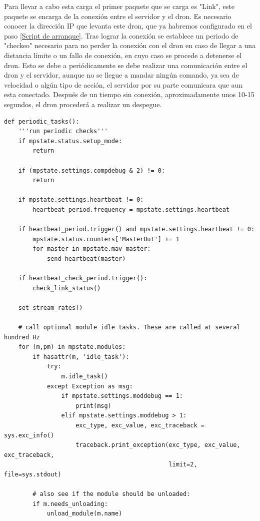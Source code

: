 Para llevar a cabo esta carga el primer paquete que se carga es "Link", este paquete se encarga de la conexión entre el servidor y el dron. Es necesario conocer la dirección IP que levanta este dron, que ya habremos configurado en el paso \ref{Script de arranque}. Tras lograr la conexión se establece un periodo de "checkeo" necesario para no perder la conexión con el dron en caso de llegar a una distancia límite o un fallo de conexión, en cuyo caso se procede a detenerse el dron. Esto se debe a periódicamente se debe realizar una comunicación entre el dron y el servidor, aunque no se llegue a mandar ningún comando, ya sea de velocidad o algún tipo de acción, el servidor por su parte comunicara que aun esta conectado. Después de un tiempo sin conexión, aproximadamente unos 10-15 segundos, el dron procederá a realizar un despegue. 

{\scriptsize
\begin{verbatim}
def periodic_tasks():
    '''run periodic checks'''
    if mpstate.status.setup_mode:
        return

    if (mpstate.settings.compdebug & 2) != 0:
        return

    if mpstate.settings.heartbeat != 0:
        heartbeat_period.frequency = mpstate.settings.heartbeat

    if heartbeat_period.trigger() and mpstate.settings.heartbeat != 0:
        mpstate.status.counters['MasterOut'] += 1
        for master in mpstate.mav_master:
            send_heartbeat(master)

    if heartbeat_check_period.trigger():
        check_link_status()

    set_stream_rates()

    # call optional module idle tasks. These are called at several hundred Hz
    for (m,pm) in mpstate.modules:
        if hasattr(m, 'idle_task'):
            try:
                m.idle_task()
            except Exception as msg:
                if mpstate.settings.moddebug == 1:
                    print(msg)
                elif mpstate.settings.moddebug > 1:
                    exc_type, exc_value, exc_traceback = sys.exc_info()
                    traceback.print_exception(exc_type, exc_value, exc_traceback,
                                              limit=2, file=sys.stdout)

        # also see if the module should be unloaded:
        if m.needs_unloading:
            unload_module(m.name)
\end{verbatim}}
            
